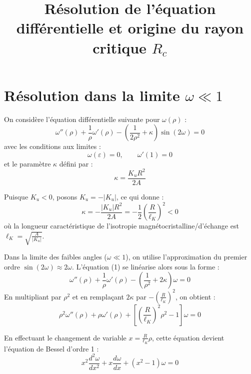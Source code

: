 \documentclass[12pt,a4paper]{article}
\title{\textbf{Résolution de l'équation différentielle et origine du rayon critique $R_c$}}
\author{}
\date{}
\begin{document}
\maketitle

\section{Résolution dans la limite $\omega \ll 1$}

On considère l'équation différentielle suivante pour $\omega(\rho)$ :
\begin{equation}
\omega''(\rho) + \frac{1}{\rho}\omega'(\rho) - \left(\frac{1}{2\rho^2} + \kappa\right)\sin(2\omega) = 0
\end{equation}
avec les conditions aux limites :
\begin{equation}
\omega(\varepsilon) = 0, \qquad \omega'(1) = 0
\end{equation}
et le paramètre $\kappa$ défini par :
\begin{equation}
\kappa = \frac{K_u R^2}{2A}
\end{equation}

Puisque $K_u < 0$, posons $K_u = -|K_u|$, ce qui donne :
\begin{equation}
\kappa = -\frac{|K_u| R^2}{2A} = -\frac{1}{2}\left(\frac{R}{\ell_K}\right)^2 < 0
\end{equation}
où la longueur caractéristique de l'isotropie magnétocristalline/d'échange est $\ell_K = \sqrt{\frac{A}{|K_u|}}$.

Dans la limite des faibles angles ($\omega \ll 1$), on utilise l'approximation du premier ordre $\sin(2\omega) \approx 2\omega$. L'équation (1) se linéarise alors sous la forme :
\begin{equation}
\omega''(\rho) + \frac{1}{\rho}\omega'(\rho) - \left(\frac{1}{\rho^2} + 2\kappa\right)\omega = 0
\end{equation}
En multipliant par $\rho^2$ et en remplaçant $2\kappa$ par $-\left(\frac{R}{\ell_K}\right)^2$, on obtient :
\begin{equation}
\rho^2 \omega''(\rho) + \rho \omega'(\rho) + \left[\left(\frac{R}{\ell_K}\right)^2 \rho^2 - 1\right] \omega = 0
\end{equation}

En effectuant le changement de variable $x = \frac{R}{\ell_K} \rho$, cette équation devient l'équation de Bessel d'ordre 1 :
\begin{equation}
x^2 \frac{d^2\omega}{dx^2} + x \frac{d\omega}{dx} + (x^2 - 1)\omega = 0
\end{equation}
\end{document}
